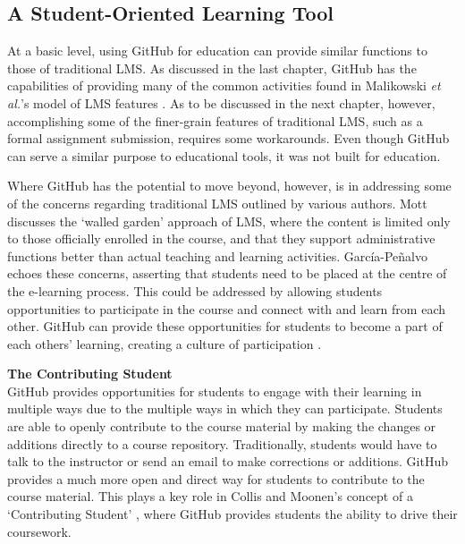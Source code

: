 \subsection{A Student-Oriented Learning Tool}
At a basic level, using GitHub for education can provide similar functions to those of traditional LMS. As discussed in the last chapter, GitHub has the capabilities of providing many of the common activities found in Malikowski \textit{et al.}'s model of LMS features \cite{malikowski2007model}. As to be discussed in the next chapter, however, accomplishing some of the finer-grain features of traditional LMS, such as a formal assignment submission, requires some workarounds. Even though GitHub can serve a similar purpose to educational tools, it was not built for education.

Where GitHub has the potential to move beyond, however, is in addressing some of the concerns regarding traditional LMS outlined by various authors. Mott \cite{mott2010envisioning} discusses the `walled garden' approach of LMS, where the content is limited only to those officially enrolled in the course, and that they support administrative functions better than actual teaching and learning activities. García-Peñalvo \cite{garcia2011opening} echoes these concerns, asserting that students need to be placed at the centre of the e-learning process. This could be addressed by allowing students opportunities to participate in the course and connect with and learn from each other. GitHub can provide these opportunities for students to become a part of each others' learning, creating a culture of participation \cite{jenkins2009confronting}.

\textbf{The Contributing Student} \\
GitHub provides opportunities for students to engage with their learning in multiple ways due to the multiple ways in which they can participate. Students are able to openly contribute to the course material by making the changes or additions directly to a course repository. Traditionally, students would have to talk to the instructor or send an email to make corrections or additions. GitHub provides a much more open and direct way for students to contribute to the course material. This plays a key role in Collis and Moonen's concept of a `Contributing Student' \cite{collis2006contributing}, where GitHub provides students the ability to drive their coursework.

